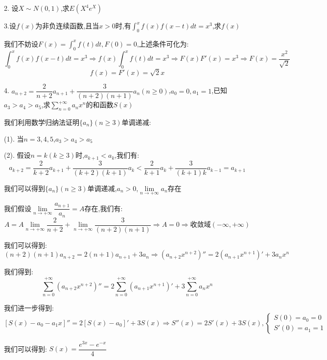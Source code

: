 2. 设$X\sim N(0,1)$,求$E(X^4e^{X})$
\begin{solution}
	
\end{solution}

3.设$f(x)$为非负连续函数,且当$x>0$时,有$\int_{0}^{x}f(x)f(x-t)dt=x^3$,求$f(x)$ 
\begin{solution}

	我们不妨设$F(x)=\int_{0}^{x}f(t)dt,F(0)=0$,上述条件可化为:  
	$$\int_{0}^{x}f(x)f(x-t)dt=x^3\Rightarrow f(x)\int_{0}^{x}f(t)dt=x^3\Rightarrow F(x)F'(x)=x^3\Rightarrow F(x)=\dfrac{x^2}{\sqrt{2}}$$
	$$f(x)=F'(x)=\sqrt{2}x$$
\end{solution}

4. $a_{n+2}=\dfrac{2}{n+2}a_{n+1}+\dfrac{3}{(n+2)(n+1)}a_{n}(n\geq 0)$,$a_{0}=0,a_{1}=1$,已知$a_{3}>a_{4}>a_{5}$,求$\sum\limits_{n=0}^{+\infty}a_{n}x^n$的和函数$S(x)$
\begin{solution}

	我们利用数学归纳法证明$\{a_{n}\}(n\geq 3)$单调递减:  
	
	(1). 当$n=3,4,5$,$a_{3}>a_{4}>a_{5}$
	
	(2). 假设$n=k(k\geq 3)$时,$a_{k+1}<a_{k}$,我们有:  
	$$a_{k+2}=\dfrac{2}{k+2}a_{k+1}+\dfrac{3}{(k+2)(k+1)}a_{k}<\dfrac{2}{k+1}a_{k}+\dfrac{3}{(k+1)k}a_{k-1}=a_{k+1}$$
	
	我们可以得到$\{a_{n}\}(n\geq 3)$单调递减,$a_{n}>0$,$\lim\limits_{n\rightarrow+\infty}a_{n}$存在
	
	我们假设$\lim\limits_{n\rightarrow+\infty}\dfrac{a_{n+1}}{a_{n}}=A$存在,我们有:  
	$$A=A\lim\limits_{n\rightarrow+\infty}\dfrac{2}{n+2}+\lim\limits_{n\rightarrow+\infty}\dfrac{3}{(n+2)(n+1)}\Rightarrow A=0\Rightarrow \text{收敛域}(-\infty,+\infty)$$
	
	我们可以得到:  
	$$(n+2)(n+1)a_{n+2}=2(n+1)a_{n+1}+3a_{n}\Rightarrow (a_{n+2}x^{n+2})''=2(a_{n+1}x^{n+1})'+3a_{n}x^n$$
	
	我们得到:  $$\sum\limits_{n=0}^{+\infty}(a_{n+2}x^{n+2})''=2\sum\limits_{n=0}^{+\infty}(a_{n+1}x^{n+1})'+3\sum\limits_{n=0}^{+\infty}a_{n}x^n$$
	
	我们进一步得到:  
	$$[S(x)-a_{0}-a_{1}x]''=2[S(x)-a_{0}]'+3S(x)\Rightarrow S''(x)=2S'(x)+3S(x),\left\lbrace
	\begin{array}{l}
		S(0)=a_{0}=0\\
		S'(0)=a_{1}=1
	\end{array}
	\right. $$
	
	我们可以得到:  $S(x)=\dfrac{e^{3x}-e^{-x}}{4}$
\end{solution}











